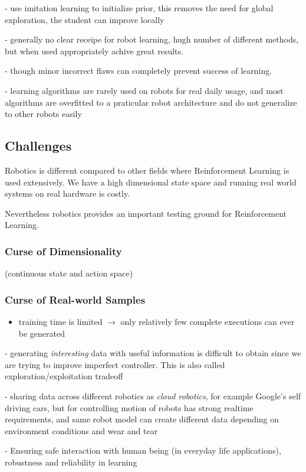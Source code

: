 - use imitation learning to initialize prior, this removes the need for global exploration,
  the student can improve locally

  - generally no clear receipe for robot learning, hugh number of different methods,
  but when used appropriately achive great results.

  - though minor incorrect flaws can completely prevent success of learning.

  - learning algorithms are rarely used on robots for real daily usage, and most
  algorithms are overfitted to a praticular robot architecture and do not generalize
  to other robots easily
  
\subsection{Challenges}
Robotics is different compared to other fields where Reinforcement Learning
is used extensively. We have a high dimensional state space and running
real world systems on real hardware is costly.

Nevertheless robotics provides an important testing ground for Reinforcement Learning.

\subsubsection{Curse of Dimensionality}
(continuous state and action space)

\subsubsection{Curse of Real-world Samples}
\begin{itemize}
\item training time is limited $\rightarrow$ only relatively few complete executions can ever be generated
\end{itemize}

- generating \textit{interesting} data with useful information is difficult to
obtain since we are trying to improve imperfect controller. This is also
called exploration/exploitation tradeoff

- sharing data across different robotics as \textit{cloud robotics}, for example Google's self
driving cars, but for controlling motion of robots has strong realtime requirements, and
same robot model can create different data depending on environment conditions and
wear and tear

- Ensuring safe interaction with human being (in everyday life applications),
robustness and reliability in learning

